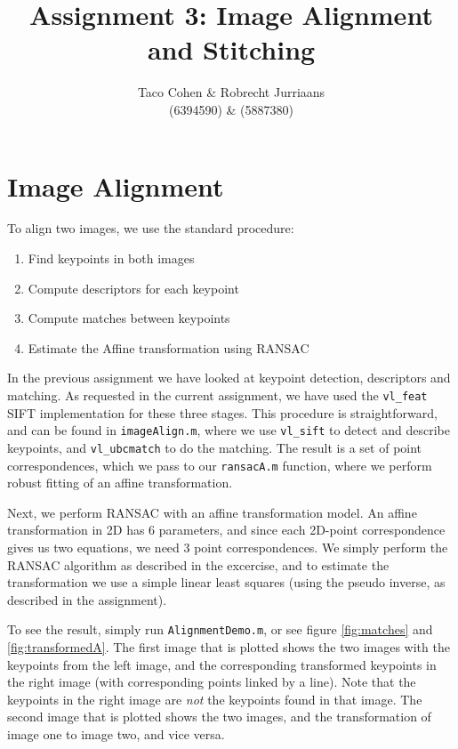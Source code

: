 \documentclass[a4paper,10pt]{article}
\title{Assignment 3: Image Alignment and Stitching}
\author{Taco Cohen \& Robrecht Jurriaans\\ (6394590) \& (5887380)}
\begin{document}
\maketitle

\section{Image Alignment}

To align two images, we use the standard procedure:
\begin{enumerate}
 \item Find keypoints in both images
 \item Compute descriptors for each keypoint
 \item Compute matches between keypoints
 \item Estimate the Affine transformation using RANSAC
\end{enumerate}

In the previous assignment we have looked at keypoint detection, descriptors and matching.
As requested in the current assignment, we have used the \verb+vl_feat+ SIFT implementation for these three stages.
This procedure is straightforward, and can be found in \verb+imageAlign.m+, where we use \verb+vl_sift+ to detect and describe keypoints,
and \verb+vl_ubcmatch+ to do the matching.
The result is a set of point correspondences, which we pass to our \verb+ransacA.m+ function, where we perform robust fitting of an affine transformation.

Next, we perform RANSAC with an affine transformation model.
An affine transformation in 2D has $6$ parameters, and since each 2D-point correspondence gives us two equations, we need 3 point correspondences.
We simply perform the RANSAC algorithm as described in the excercise, and to estimate the transformation we use a simple linear least squares (using the pseudo inverse, as described in the assignment).

To see the result, simply run \verb+AlignmentDemo.m+, or see figure \ref{fig:matches} and \ref{fig:transformedA}.
The first image that is plotted shows the two images with the keypoints from the left image, and the corresponding transformed keypoints in the right image (with corresponding points linked by a line).
Note that the keypoints in the right image are \emph{not} the keypoints found in that image.
The second image that is plotted shows the two images, and the transformation of image one to image two, and vice versa.
\end{document}
